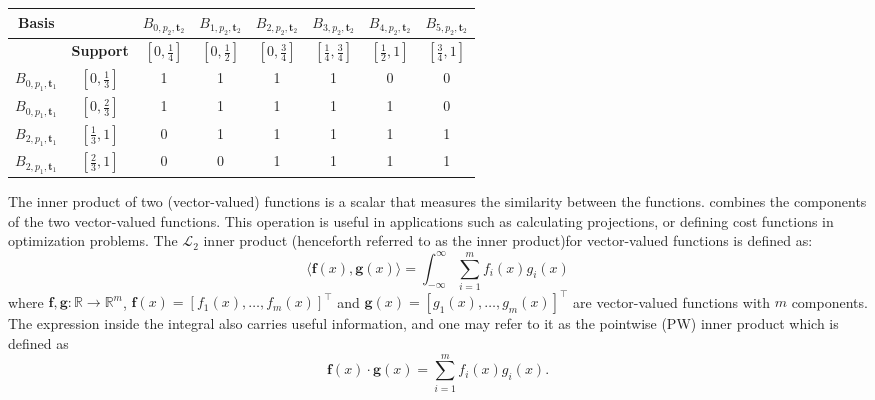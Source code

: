\begin{indentedexample}
    \centering
    \small
    \begin{tabular}{c|c||c|c|c|c|c|c}
        \textbf{Basis} &  & $B_{0, p_2, \mathbf{t}_2}$ & $B_{1, p_2, \mathbf{t}_2}$ & $B_{2, p_2, \mathbf{t}_2}$ & $B_{3, p_2, \mathbf{t}_2}$ & $B_{4, p_2, \mathbf{t}_2}$ & $B_{5, p_2, \mathbf{t}_2}$ \\[5pt]
        \hline
        \rule{0pt}{2.5ex} & \textbf{Support} & $\left[0, \frac{1}{4}\right]$ & $\left[0, \frac{1}{2}\right]$ & $\left[0, \frac{3}{4}\right]$ & $\left[\frac{1}{4}, \frac{3}{4}\right]$ & $\left[\frac{1}{2}, 1\right]$ & $\left[\frac{3}{4}, 1\right]$ \\[5pt]
        \hline\hline
        \rule{0pt}{2.5ex}$B_{0, p_1, \mathbf{t}_1}$ & $\left[0, \frac{1}{3}\right]$ & 
        1 & 1 & 1 & 1 & 0 & 0 \\[5pt]\hline\rule{0pt}{2.5ex}
        $B_{0, p_1, \mathbf{t}_1}$ & $\left[0, \frac{2}{3}\right]$ &
        1 & 1 & 1 & 1 & 1 & 0 \\[5pt]\hline\rule{0pt}{2.5ex}
        $B_{2, p_1, \mathbf{t}_1}$ & $\left[\frac{1}{3}, 1\right]$ &
        0 & 1 & 1 & 1 & 1 & 1 \\[5pt]\hline\rule{0pt}{2.5ex}
        $B_{2, p_1, \mathbf{t}_1}$ & $\left[\frac{2}{3}, 1\right]$ & 
        0 & 0 & 1 & 1 & 1 & 1 \\[5pt]
    \end{tabular}
    \label{tab:ex-spline-supports}

\end{indentedexample}

The inner product of two (vector-valued) functions is a scalar that measures the similarity between the functions. combines the components of the two vector-valued functions. This operation is useful in applications such as calculating projections, or defining cost functions in optimization problems. The $\mathcal L_2$ inner product (henceforth referred to as the inner product)for vector-valued functions is defined as:
\begin{equation}
    \label{eq:dot-product}
    \langle\mathbf f(x), \mathbf g(x)\rangle = \int_{-\infty}^\infty\sum_{i=1}^m f_i(x) g_i(x)
\end{equation}
where $\mathbf f, \mathbf g: \mathbb{R} \to \mathbb{R}^m$, $\mathbf f(x) = [f_1(x), \ldots, f_m(x)]^\top$ and $\mathbf g(x) = [g_1(x), \ldots, g_m(x)]^\top$ are vector-valued functions with $m$ components. The expression inside the integral also carries useful information, and one may refer to it as the pointwise (PW) inner product which is defined as
\begin{equation}
    \label{eq:dot-product-pointwise}
    \mathbf f(x) \cdot \mathbf g(x) = \sum_{i=1}^m f_i(x) g_i(x).
\end{equation}

